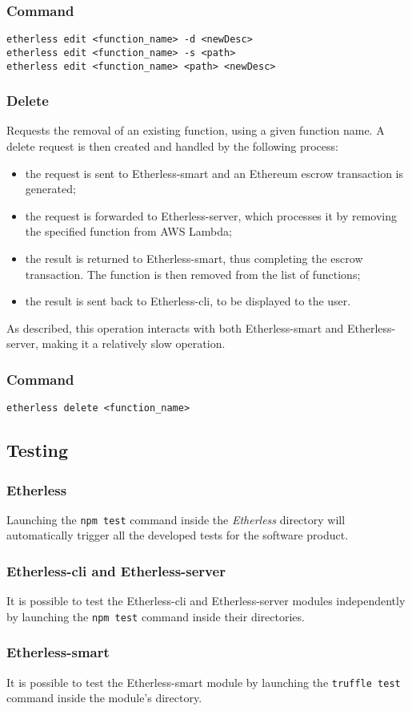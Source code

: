 	\subsubsection*{Command}
	\texttt{etherless edit <function\_name> -d <newDesc>} \\
	\texttt{etherless edit <function\_name> -s <path>} \\
	\texttt{etherless edit <function\_name> <path> <newDesc>} \\
	\subsubsection{Delete}
	Requests the removal of an existing function, using a given function name. A delete request is then created and handled by the following process:
	\begin{itemize}
		\item the request is sent to Etherless-smart and an Ethereum escrow transaction is generated;
		\item the request is forwarded to Etherless-server, which processes it by removing the specified function from AWS Lambda;
		\item the result is returned to Etherless-smart, thus completing the escrow transaction. The function is then removed from the list of functions;
		\item the result is sent back to Etherless-cli, to be displayed to the user.
	\end{itemize}
	As described, this operation interacts with both Etherless-smart and Etherless-server, making it a relatively slow operation.
	\subsubsection*{Command}
	\texttt{etherless delete <function\_name>}
\subsection{Testing}
\subsubsection{Etherless}
Launching the \texttt{npm test} command inside the \textit{Etherless} directory will automatically trigger all the developed tests for the software product.
\subsubsection{Etherless-cli and Etherless-server}
It is possible to test the Etherless-cli and Etherless-server modules independently by launching the \texttt{npm test} command inside their directories.
\subsubsection{Etherless-smart}
It is possible to test the Etherless-smart module by launching the \texttt{truffle test} command inside the module's directory.
